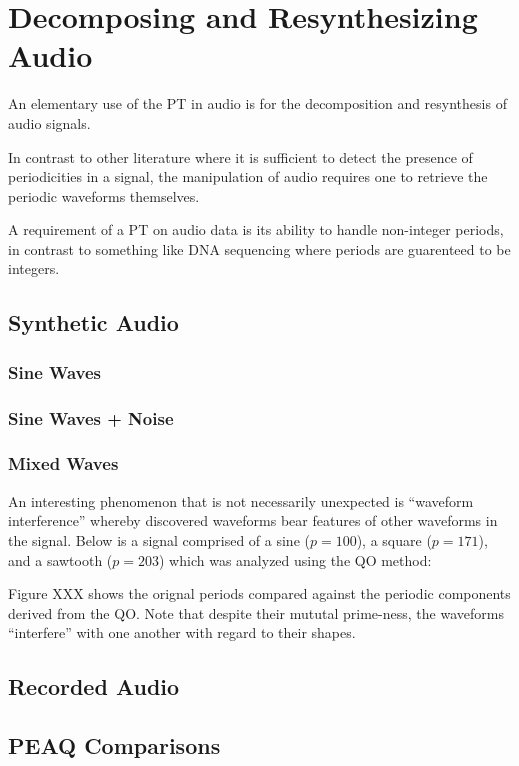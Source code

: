 \chapter{Decomposing and Resynthesizing Audio}
An elementary use of the PT in audio is for the decomposition and resynthesis of audio signals.

In contrast to other literature where it is sufficient to detect the presence of periodicities in a signal, the manipulation of audio requires one to retrieve the periodic waveforms themselves.

A requirement of a PT on audio data is its ability to handle non-integer periods, in contrast to something like DNA sequencing where periods are guarenteed to be integers.

\section{Synthetic Audio}

\subsection{Sine Waves}

\subsection{Sine Waves + Noise}

\subsection{Mixed Waves}
An interesting phenomenon that is not necessarily unexpected is ``waveform interference'' whereby discovered waveforms bear features of other waveforms in the signal. Below is a signal comprised of a sine ($p = 100$), a square ($p = 171$), and a sawtooth ($p = 203$) which was analyzed using the QO method:

Figure XXX shows the orignal periods compared against the periodic components derived from the QO. Note that despite their mututal prime-ness, the waveforms ``interfere'' with one another with regard to their shapes.




\section{Recorded Audio}


\section{PEAQ Comparisons}
